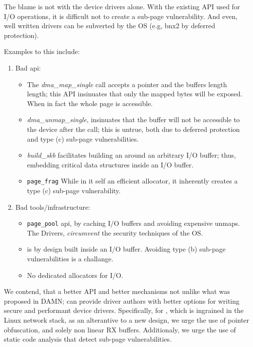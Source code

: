 The blame is not with the device drivers alone. With the existing API used for I/O operations, it is difficult not to create a sub-page vulnerability. And even, well written drivers can be subverted by the OS (e.g, bnx2 by deferred protection). 

Examples to this include: 
\begin{enumerate}
    \item Bad api: \begin{itemize}
        \item The \textit{dma\_map\_single} call accepts a pointer and the buffers length length; this API insinuates that only the mapped bytes will be exposed.
        When in fact the whole page is accessible.
        \item \textit{dma\_unmap\_single}, insinuates that the buffer will not be accessible to the device after the call; this is untrue, both due to deferred protection and type (c) sub-page vulnerabilities.
        \item \textit{build\_skb} facilitates building an \skb{} around an arbitrary I/O buffer; thus, embedding critical data structures inside an I/O buffer.
        \item \texttt{page\_frag} While in it self an efficient allocator, it inherently creates a type (c) sub-page vulnerability.
    \end{itemize} 
    \item Bad tools/infrastructure: \begin{itemize}
            \item \texttt{page\_pool} api, by caching I/O buffers and avoiding expensive unmaps. The Drivers, \emph{circumvent} the security techniques of the OS. 
            \item \shinfo is by design built inside an I/O buffer. Avoiding type (b) sub-page vulnerabilities is a challange.
            \item No dedicated allocators for I/O.
    \end{itemize}
\end{enumerate}

We contend, that a better API and better mechanisms not unlike what was proposed in DAMN\cite{MSMT18,MMT16}; can provide driver authors with better options for writing secure and performant device drivers.
Specifically, for \shinfo, which is ingrained in the Linux network stack, as an alterantive to a new design, we urge the use of pointer obfuscation\cite{Coo17}, and solely non linear RX buffers.
Additionaly, we urge the use of static code analysis that detect sub-page vulnerabilities.

